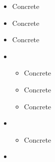 \begin{itemize}
\begin{itemize}
   \end{itemize}
 \item[\clsnmref{PointGroup}] Concrete
 \item[\clsnmref{SCBlockInfo}] Concrete
 \item[\clsnmref{SCDimension}] Concrete
 \item[\clsnmref{SCMatrixKit}]
   \begin{itemize}
     \item[\clsnmref{DistSCMatrixKit}] Concrete
     \item[\clsnmref{LocalSCMatrixKit}] Concrete
     \item[\clsnmref{ReplSCMatrixKit}] Concrete
   \end{itemize}
 \item[\clsnmref{SelfConsistentExtrapolation}]
   \begin{itemize}
     \item[\clsnmref{DIIS}] Concrete
   \end{itemize}
 \item[\clsnmref{SetIntCoor}]
\end{itemize}
